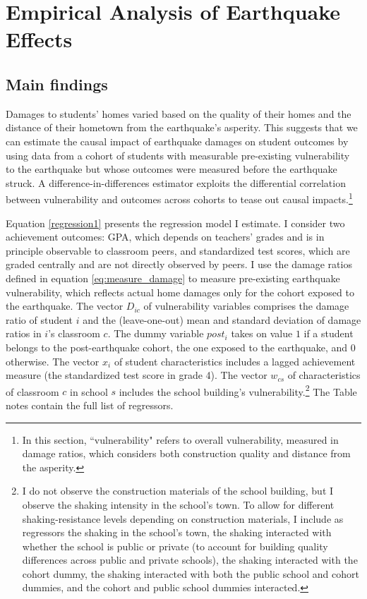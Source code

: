 \section{Empirical Analysis of Earthquake Effects}\label{sec:analysis_earthquake_effects}



\subsection{Main findings}\label{sec:main_findings}

Damages to students' homes varied based on the quality of their homes and the distance of their hometown from the earthquake's asperity. This suggests that we can estimate the causal impact of earthquake damages on student outcomes by using data from a cohort of students with measurable pre-existing vulnerability to the earthquake but whose outcomes were measured before the earthquake struck. A difference-in-differences estimator exploits the differential correlation between vulnerability and outcomes across cohorts to tease out causal impacts.\footnote{In this section, ``vulnerability" refers to overall vulnerability, measured in damage ratios, which considers both construction quality and distance from the asperity.}\par 


Equation \eqref{regression1} presents the regression model I estimate. I consider two achievement outcomes: GPA, which depends on teachers' grades and is in principle observable to classroom peers, and standardized test scores, which are graded centrally and are not directly observed by peers. I use the damage ratios defined in equation \eqref{eq:measure_damage} to measure pre-existing earthquake vulnerability, which reflects actual home damages only for the cohort exposed to the earthquake. The vector $D_{ic}$ of vulnerability variables comprises the damage ratio of student $i$ and the (leave-one-out) mean and standard deviation of damage ratios in $i$'s classroom $c$. The dummy variable $post_i$ takes on value $1$ if a student belongs to the post-earthquake cohort, the one exposed to the earthquake, and $0$ otherwise. The vector $x_i$ of student characteristics includes a lagged achievement measure (the standardized test score in grade 4). The vector $w_{cs}$ of characteristics of classroom $c$ in school $s$ includes the school building's vulnerability.\footnote{ I do not observe the construction materials of the school building, but I observe the shaking intensity in the school's town. To allow for different shaking-resistance levels depending on construction materials, I include as regressors the shaking in the school's town, the shaking interacted with whether the school is public or private (to account for building quality differences across public and private schools),  the shaking interacted with the cohort dummy, the shaking interacted with both the public school and cohort dummies, and the cohort and public school dummies interacted.} The Table notes contain the full list of regressors. \par 





